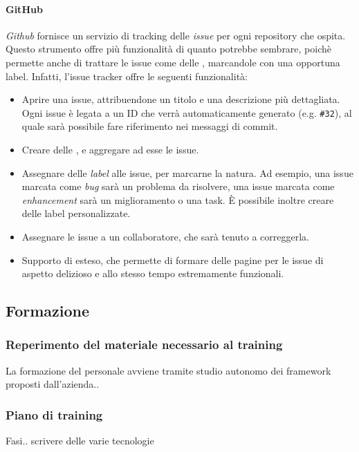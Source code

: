     		\paragraph{GitHub}
			\emph{Github} fornisce un servizio di tracking delle \emph{issue} per ogni repository che ospita. Questo strumento offre più funzionalità di quanto potrebbe
			sembrare, poichè permette anche di trattare le issue come delle , marcandole con una opportuna label. Infatti, l'issue tracker offre le seguenti 
			funzionalità:
			\begin{itemize}
				\item Aprire una issue, attribuendone un titolo e una descrizione più dettagliata. Ogni issue è legata a un ID che verrà automaticamente generato (e.g. \texttt{\#32}),
					al quale sarà possibile fare riferimento nei messaggi di commit.
				\item Creare delle , e aggregare ad esse le issue.
				\item Assegnare delle \emph{label} alle issue, per marcarne la natura. Ad esempio, una issue marcata come \emph{bug} sarà un problema da risolvere,
					una issue marcata come \emph{enhancement} sarà un miglioramento o una task. È possibile inoltre creare delle label personalizzate.
				\item Assegnare le issue a un collaboratore, che sarà tenuto a correggerla.
				\item Supporto di  esteso, che permette di formare delle pagine per le issue di aspetto delizioso e allo stesso tempo estremamente funzionali.
			\end{itemize}
    		

			
	
	\subsection{Formazione}		
	
		\subsubsection{Reperimento del materiale necessario al training}
		La formazione del personale avviene tramite studio autonomo dei framework proposti dall'azienda..
		
		\subsubsection{Piano di training}
		Fasi..
		scrivere delle varie tecnologie
		
    
    
    
    

